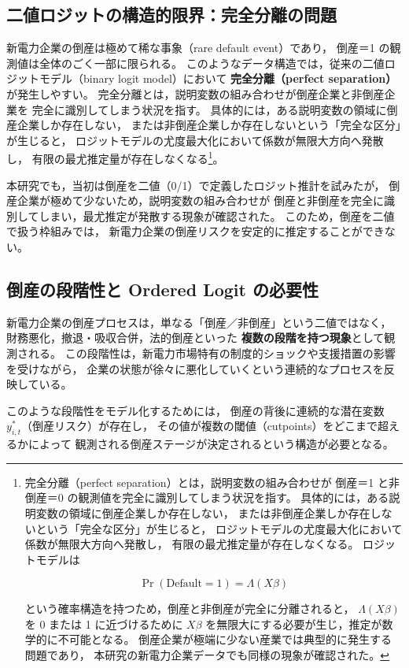 \subsection{二値ロジットの構造的限界：完全分離の問題}

新電力企業の倒産は極めて稀な事象（rare default event）であり，
倒産＝1 の観測値は全体のごく一部に限られる。
このようなデータ構造では，従来の二値ロジットモデル（binary logit model）において
\textbf{完全分離（perfect separation）} が発生しやすい。
完全分離とは，説明変数の組み合わせが倒産企業と非倒産企業を
完全に識別してしまう状況を指す。
具体的には，ある説明変数の領域に倒産企業しか存在しない，
または非倒産企業しか存在しないという「完全な区分」が生じると，
ロジットモデルの尤度最大化において係数が無限大方向へ発散し，
有限の最尤推定量が存在しなくなる\footnote{
完全分離（perfect separation）とは，説明変数の組み合わせが
倒産＝1 と非倒産＝0 の観測値を完全に識別してしまう状況を指す。
具体的には，ある説明変数の領域に倒産企業しか存在しない，
または非倒産企業しか存在しないという「完全な区分」が生じると，
ロジットモデルの尤度最大化において係数が無限大方向へ発散し，
有限の最尤推定量が存在しなくなる。
ロジットモデルは


\[
\Pr(\text{Default}=1)=\Lambda(X\beta)
\]


という確率構造を持つため，倒産と非倒産が完全に分離されると，
$\Lambda(X\beta)$ を 0 または 1 に近づけるために
$X\beta$ を無限大にする必要が生じ，推定が数学的に不可能となる。
倒産企業が極端に少ない産業では典型的に発生する問題であり，
本研究の新電力企業データでも同様の現象が確認された。
}。

本研究でも，当初は倒産を二値（0/1）で定義したロジット推計を試みたが，
倒産企業が極めて少ないため，説明変数の組み合わせが
倒産と非倒産を完全に識別してしまい，最尤推定が発散する現象が確認された。
このため，倒産を二値で扱う枠組みでは，
新電力企業の倒産リスクを安定的に推定することができない。

\subsection{倒産の段階性と Ordered Logit の必要性}

新電力企業の倒産プロセスは，単なる「倒産／非倒産」という二値ではなく，
財務悪化，撤退・吸収合併，法的倒産といった
\textbf{複数の段階を持つ現象}として観測される。
この段階性は，新電力市場特有の制度的ショックや支援措置の影響を受けながら，
企業の状態が徐々に悪化していくという連続的なプロセスを反映している。

このような段階性をモデル化するためには，
倒産の背後に連続的な潜在変数 $y^*_{i,t}$（倒産リスク）が存在し，
その値が複数の閾値（cutpoints）をどこまで超えるかによって
観測される倒産ステージが決定されるという構造が必要となる。

